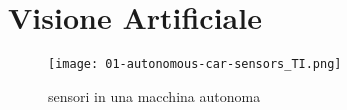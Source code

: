\section{Visione Artificiale}
\begin{figure}[h]
    \texttt{[image: 01-autonomous-car-sensors\_TI.png]}
    \caption{sensori in una macchina autonoma\cite{sensors}}
    \label{fig:sensors}
\end{figure}